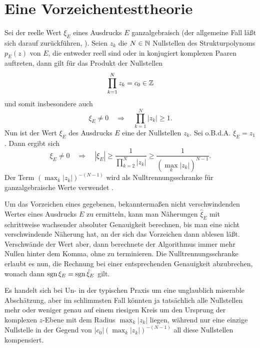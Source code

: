 %
%
%
\pagebreak
\section{Eine Vorzeichentesttheorie}


\begin{remark}[Aufgabenstellung]\label{re:Aufgabenstellung}
Sei der reelle Wert $\xi_E$ eines Ausdrucks $E$ ganzalgebraisch
(der allgemeine Fall läßt sich darauf zurückführen, \cite{BFMS, BFMSS}).
Seien $z_k$ die $N\in\mathbb{N}$ Nullstellen
des Strukturpolynoms $p_E(z)$ von $E$,
die entweder reell sind 
oder in konjugiert komplexen Paaren auftreten,
dann gilt für das Produkt der Nullstellen
\begin{equation*}
  \prod_{k=1}^N z_k = c_0 \in \mathbb{Z}
\end{equation*}
und somit insbesondere auch
\begin{equation*}
  \xi_E\ne0
  \quad\Rightarrow\quad
  \prod_{k=1}^N |z_k| \ge 1.
\end{equation*}
Nun ist der Wert $\xi_E$ des Ausdrucks $E$
eine der Nullstellen $z_k$.
Sei o.B.d.A. $\xi_E = z_1$.
Dann ergibt sich
\begin{equation}\label{eq:Nulltrennungschranke}
  \xi_E\ne0
  \quad\Rightarrow\quad
  |\xi_E|
  \ge
  \frac{1}{\prod_{k=2}^N |z_k|}
  \ge
  \frac{1}{(\max_k|z_k|)^{N-1}}.
\end{equation}
Der Term $(\max_k|z_k|)^{-(N-1)}$ wird als Nulltrennungsschranke 
für ganzalgebraische Werte verwendet \cite{BFMS}.

Um das Vorzeichen eines gegebenen, 
bekanntermaßen nicht verschwindenden Wertes 
eines Ausdrucks $E$ zu ermitteln,
kann man Näherungen $\hat{\xi}_E$ mit schrittweise wachsender 
absoluter Genauigkeit berechnen,
bis man eine nicht verschwindende Näherung hat, 
an der sich das Vorzeichen dann ablesen läßt.
Verschwände der Wert aber, dann berechnete der Algorithmus
immer mehr Nullen hinter dem Komma, ohne zu terminieren.
Die Nulltrennungsschranke erlaubt es nun, 
die Rechnung bei einer entsprechenden Genauigkeit abzubrechen,
wonach dann $\operatorname{sgn}\xi_E=\operatorname{sgn}\hat{\xi}_E$ gilt.

Es handelt sich bei Un-
in der typischen Praxis um eine unglaublich miserable Abschätzung,
aber im schlimmsten Fall könnten ja tatsächlich alle Nullstellen
mehr oder weniger genau auf einem riesigen Kreis 
um den Ursprung der komplexen $z$-Ebene
mit dem Radius $\max_k|z_k|$ liegen,
während nur eine einzige Nullstelle 
in der Gegend von $|c_0|(\max_k|z_k|)^{-(N-1)}$
all diese Nullstellen kompensiert.


\end{remark}
